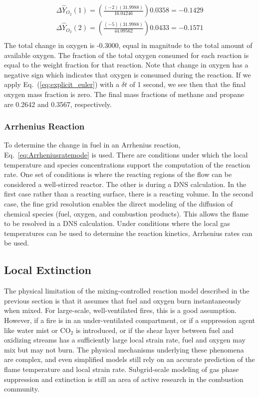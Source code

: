 \begin{align}
\Delta \hat{Y}_{O_2}(1) =  \left(\frac{(-2)(31.9988)}{16.04246}\right)0.0358 = -0.1429 \\
\Delta \hat{Y}_{O_2}(2) =  \left(\frac{(-5)(31.9988)}{44.09562}\right)0.0433 = -0.1571 \\
\end{align}
The total change in oxygen is -0.3000, equal in magnitude to the total amount of available oxygen. The fraction of the total oxygen consumed for each reaction is equal to the weight fraction for that reaction. Note that change in oxygen has a negative sign which indicates that oxygen is consumed during the reaction. If we apply Eq.~(\ref{eq:explicit_euler}) with a $\delta t$ of 1 second, we see then that the final oxygen mass fraction is zero. The final mass fractions of methane and propane are 0.2642 and 0.3567, respectively.

\subsubsection{Arrhenius Reaction}
To determine the change in fuel in an Arrhenius reaction, Eq.~\ref{eq:Arrheniusratemode} is used. There are conditions under which the local temperature and species concentrations support the computation of the reaction rate.  One set of conditions is where the reacting regions of the flow can be considered a well-stirred reactor.  The other is during a DNS calculation.  In the first case rather than a reacting surface, there is a reacting volume.  In the second case, the fine grid resolution enables the direct modeling of the diffusion of chemical species (fuel,
oxygen, and combustion products).  This allows the flame to be resolved in a DNS calculation.  Under conditions where the local gas
temperatures can be used to determine the reaction kinetics, Arrhenius rates can be used.


\subsection{Local Extinction}

\label{extinction}

The physical limitation of the mixing-controlled reaction model described in the previous section is that it assumes that fuel and oxygen burn instantaneously when mixed. For large-scale, well-ventilated
fires, this is a good assumption. However, if a fire is in an
under-ventilated compartment, or if a suppression agent like water
mist or CO$_2$ is introduced, or if the shear layer between fuel and oxidizing streams
has a sufficiently large local strain rate,
fuel and oxygen may mix but may not burn.
The physical mechanisms underlying these phenomena are complex, and
even simplified models still rely on an accurate prediction
of the flame temperature and local strain rate.
Subgrid-scale modeling of gas phase suppression and
extinction is still an area of active research in the combustion
community.

